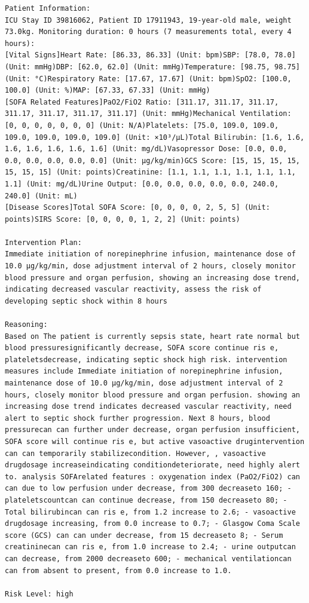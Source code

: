 \documentclass{article}
\begin{document}
\begin{lstlisting}[caption={Result for Patient 39816062}, label={lst:39816062}]
Patient Information:
ICU Stay ID 39816062, Patient ID 17911943, 19-year-old male, weight 73.0kg. Monitoring duration: 0 hours (7 measurements total, every 4 hours):
[Vital Signs]Heart Rate: [86.33, 86.33] (Unit: bpm)SBP: [78.0, 78.0] (Unit: mmHg)DBP: [62.0, 62.0] (Unit: mmHg)Temperature: [98.75, 98.75] (Unit: °C)Respiratory Rate: [17.67, 17.67] (Unit: bpm)SpO2: [100.0, 100.0] (Unit: %)MAP: [67.33, 67.33] (Unit: mmHg)
[SOFA Related Features]PaO2/FiO2 Ratio: [311.17, 311.17, 311.17, 311.17, 311.17, 311.17, 311.17] (Unit: mmHg)Mechanical Ventilation: [0, 0, 0, 0, 0, 0, 0] (Unit: N/A)Platelets: [75.0, 109.0, 109.0, 109.0, 109.0, 109.0, 109.0] (Unit: ×10³/μL)Total Bilirubin: [1.6, 1.6, 1.6, 1.6, 1.6, 1.6, 1.6] (Unit: mg/dL)Vasopressor Dose: [0.0, 0.0, 0.0, 0.0, 0.0, 0.0, 0.0] (Unit: μg/kg/min)GCS Score: [15, 15, 15, 15, 15, 15, 15] (Unit: points)Creatinine: [1.1, 1.1, 1.1, 1.1, 1.1, 1.1, 1.1] (Unit: mg/dL)Urine Output: [0.0, 0.0, 0.0, 0.0, 0.0, 240.0, 240.0] (Unit: mL)
[Disease Scores]Total SOFA Score: [0, 0, 0, 0, 2, 5, 5] (Unit: points)SIRS Score: [0, 0, 0, 0, 1, 2, 2] (Unit: points)

Intervention Plan:
Immediate initiation of norepinephrine infusion, maintenance dose of 10.0 μg/kg/min, dose adjustment interval of 2 hours, closely monitor blood pressure and organ perfusion, showing an increasing dose trend, indicating decreased vascular reactivity, assess the risk of developing septic shock within 8 hours

Reasoning:
Based on The patient is currently sepsis state, heart rate normal but blood pressuresignificantly decrease, SOFA score continue ris e, plateletsdecrease, indicating septic shock high risk. intervention measures include Immediate initiation of norepinephrine infusion, maintenance dose of 10.0 μg/kg/min, dose adjustment interval of 2 hours, closely monitor blood pressure and organ perfusion. showing an increasing dose trend indicates decreased vascular reactivity, need alert to septic shock further progression. Next 8 hours, blood pressurecan can further under decrease, organ perfusion insufficient, SOFA score will continue ris e, but active vasoactive drugintervention can can temporarily stabilizecondition. However, , vasoactive drugdosage increaseindicating conditiondeteriorate, need highly alert to. analysis SOFArelated features : oxygenation index (PaO2/FiO2) can can due to low perfusion under decrease, from 300 decreaseto 160; - plateletscountcan can continue decrease, from 150 decreaseto 80; - Total bilirubincan can ris e, from 1.2 increase to 2.6; - vasoactive drugdosage increasing, from 0.0 increase to 0.7; - Glasgow Coma Scale score (GCS) can can under decrease, from 15 decreaseto 8; - Serum creatininecan can ris e, from 1.0 increase to 2.4; - urine outputcan can decrease, from 2000 decreaseto 600; - mechanical ventilationcan can from absent to present, from 0.0 increase to 1.0.

Risk Level: high
\end{lstlisting}
\end{document}
